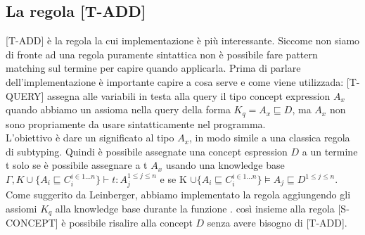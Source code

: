             \subsection{La regola [T-ADD]}
            [T-ADD] è la regola la cui implementazione è più interessante. Siccome non siamo di fronte ad una regola puramente sintattica
            non è possibile fare pattern matching sul termine per capire quando applicarla.
            Prima di parlare dell'implementazione è importante capire a cosa serve e come viene utilizzada: [T-QUERY] assegna alle variabili in testa alla query
            il tipo concept expression $A_x$ quando abbiamo un assioma nella query della forma $K_q = A_x \sqsubseteq D$, ma $A_x$ non sono propriamente da usare sintatticamente nel programma.
            \\L'obiettivo è dare un significato al tipo $A_x$, in modo simile a una classica regola di subtyping. Quindi è possibile assegnate una concept espression $D$
            a un termine t solo se è possibile assegnare a t $A_x$ usando una knowledge base $\Gamma,K \cup \{A_i \sqsubseteq C_i^{i \in 1...n}\} \vdash t : A_j^{1 \leq j \leq n}$
            e se K $\cup \{A_i \sqsubseteq C_i^{i \in 1...n}\} \vDash A_j \sqsubseteq D^{1 \leq j \leq n}$.
            \\Come suggerito da Leinberger, abbiamo implementato la regola aggiungendo gli assiomi $K_q$ alla knowledge base durante la funzione .
            così insieme alla regola {[S-CONCEPT]} è possibile risalire alla concept $D$ senza avere bisogno di [T-ADD].
